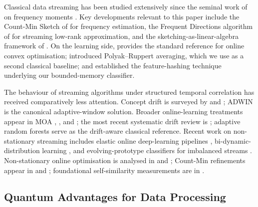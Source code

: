 \documentclass[preprint,12pt,authoryear]{elsarticle}
\begin{document}
Classical data streaming has been studied extensively since the seminal work of \citet{alon1999space} on frequency moments \citep{muthukrishnan2005data}. Key developments relevant to this paper include the Count-Min Sketch of \citet{cormode2005improved} for frequency estimation, the Frequent Directions algorithm of \citet{ghashami2016frequent} for streaming low-rank approximation, and the sketching-as-linear-algebra framework of \citet{woodruff2014sketching}. On the learning side, \citet{shalev2012online} provides the standard reference for online convex optimisation; \citet{polyak1992averaging} introduced Polyak--Ruppert averaging, which we use as a second classical baseline; and \citet{weinberger2009featurehashing} established the feature-hashing technique underlying our bounded-memory classifier.

The behaviour of streaming algorithms under structured temporal correlation has received comparatively less attention. Concept drift is surveyed by \citet{gama2014driftsurvey} and \citet{ditzler2015nonstationary}; ADWIN \citep{bifet2007adwin} is the canonical adaptive-window solution. Broader online-learning treatments appear in MOA \citep{bifet2010moa}, \citet{hoi2021online}, and \citet{gama2010knowledge}; the most recent systematic drift review is \citet{arora2024driftreview}; adaptive random forests \citep{gomes2017adaptiverf} serve as the drift-aware classical reference. Recent work on non-stationary streaming includes elastic online deep-learning pipelines \citep{su2024elasticonline}, bi-dynamic-distribution learning \citep{yan2024bidynamic}, and evolving-prototype classifiers for imbalanced streams \citep{wu2024evolvingprototypes}. Non-stationary online optimisation is analysed in \citet{besbes2015non} and \citet{ben2010agnostic}; Count-Min refinements appear in \citet{benmazziane2022countmin} and \citet{cormode2011synopses}; foundational self-similarity measurements are in \citet{park2000selfsimilar}.

\subsection{Quantum Advantages for Data Processing}
\end{document}
